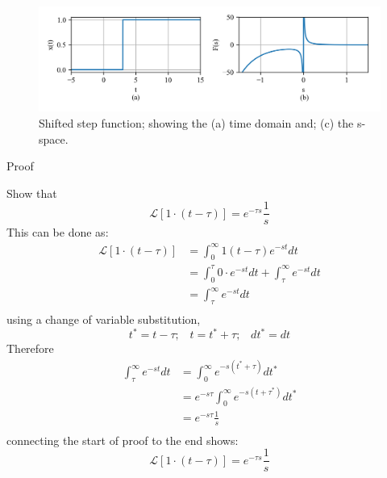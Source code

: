 \documentclass[12pt,letter]{article}
\numberwithin{ex}{section} %
\numberwithin{re}{section} %
\newcommand{\gr}[1]{\textcolor[rgb]{0.00,0.50,0.00}{#1}}
\newcommand{\Laplace}[1]{\ensuremath{\mathcal{L}{\left[#1\right]}}}
\numberwithin{equation}{section}	%
\begin{document}
		\begin{figure}[H]
			\centering
			\includegraphics[width=6.5in]{../figures/T_and_S_shifted_space_step_function}
			\caption{Shifted step function; showing the (a) time domain and; (c) the s-space. }
			\label{fig:Laplace_shifted_step_transform}
		\end{figure}

\begin{mdframed}[middlelinewidth=0.5mm]
\begin{center}
\gr{Proof}
\end{center}
Show that
\begin{equation}
\Laplace{1\cdot(t-\tau)} =e^{-\tau s} \frac{1}{s}
\end{equation}
This can be done as:
\begin{equation}
\end{equation}
\begin{align}
	 \Laplace{1\cdot(t-\tau)}  &=  \int_{0}^{\infty} 1 (t-\tau) e^{-st} dt \\ \nonumber
	&=  \int_{0}^{\tau} 0 \cdot  e^{-st} dt + \int_{\tau}^{\infty} e^{-st} dt  \\ \nonumber
	&=  \int_{\tau}^{\infty} e^{-st} dt  \\ \nonumber
\end{align}
using a change of variable substitution, 
\begin{equation}
t^* = t-\tau; \; \; \; t = t^* + \tau; \; \; \; dt^* = dt
\end{equation}
Therefore
\begin{align}
	 \int_{\tau}^{\infty} e^{-st} dt  &=  \int_{0}^{\infty}e ^ {-s (t^* + \tau)} dt^* \\ \nonumber
	&=  e^{-s \tau}  \int_{0}^{\infty}e ^ {-s (t + \tau^*)} dt^*   \\ \nonumber
	&=  e^{-s \tau} \frac{1}{s}  \\ \nonumber
\end{align}
connecting the start of proof to the end shows:
\begin{equation}
\Laplace{1\cdot(t-\tau)} =e^{-\tau s} \frac{1}{s}
\end{equation}
\end{mdframed}
\end{document}
